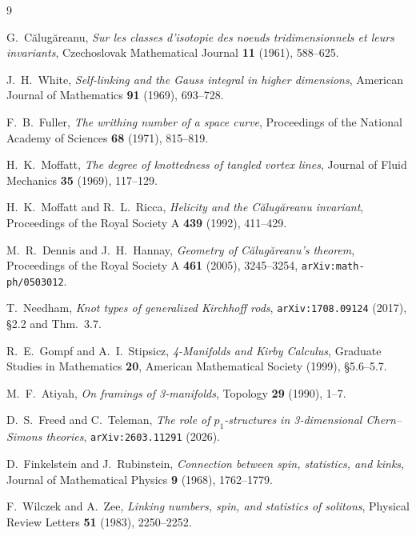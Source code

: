 \documentclass[11pt,a4paper]{article}
\begin{document}
\begin{thebibliography}{9}

G.~C\u{a}lug\u{a}reanu,
\textit{Sur les classes d'isotopie des noeuds tridimensionnels et leurs invariants},
Czechoslovak Mathematical Journal \textbf{11} (1961), 588--625.

J.~H.~White,
\textit{Self-linking and the Gauss integral in higher dimensions},
American Journal of Mathematics \textbf{91} (1969), 693--728.

F.~B.~Fuller,
\textit{The writhing number of a space curve},
Proceedings of the National Academy of Sciences \textbf{68} (1971), 815--819.

H.~K.~Moffatt,
\textit{The degree of knottedness of tangled vortex lines},
Journal of Fluid Mechanics \textbf{35} (1969), 117--129.

H.~K.~Moffatt and R.~L.~Ricca,
\textit{Helicity and the C\u{a}lug\u{a}reanu invariant},
Proceedings of the Royal Society A \textbf{439} (1992), 411--429.

M.~R.~Dennis and J.~H.~Hannay,
\textit{Geometry of C\u{a}lug\u{a}reanu's theorem},
Proceedings of the Royal Society A \textbf{461} (2005), 3245--3254,
\texttt{arXiv:math-ph/0503012}.

T.~Needham,
\textit{Knot types of generalized Kirchhoff rods},
\texttt{arXiv:1708.09124} (2017), \S2.2 and Thm.~3.7.

R.~E.~Gompf and A.~I.~Stipsicz,
\textit{4-Manifolds and Kirby Calculus},
Graduate Studies in Mathematics \textbf{20}, American Mathematical
Society (1999), \S5.6--5.7.

M.~F.~Atiyah,
\textit{On framings of 3-manifolds},
Topology \textbf{29} (1990), 1--7.

D.~S.~Freed and C.~Teleman,
\textit{The role of $p_1$-structures in 3-dimensional Chern--Simons
theories},
\texttt{arXiv:2603.11291} (2026).

D.~Finkelstein and J.~Rubinstein,
\textit{Connection between spin, statistics, and kinks},
Journal of Mathematical Physics \textbf{9} (1968), 1762--1779.

F.~Wilczek and A.~Zee,
\textit{Linking numbers, spin, and statistics of solitons},
Physical Review Letters \textbf{51} (1983), 2250--2252.


\end{thebibliography}
\end{document}
